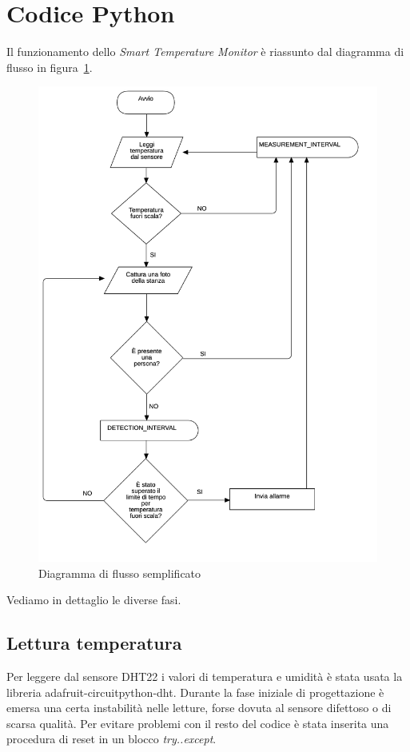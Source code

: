 \documentclass[italian,12pt,a4paper,oneside,final]{report}
\begin{document}
\section{Codice Python}
Il funzionamento dello \emph{Smart Temperature Monitor} è riassunto dal diagramma di flusso in figura~\ref{fig:flowchart}.
\begin{figure}[h]
	\centering
	\includegraphics[scale=0.215]{flowchart.png}
	\caption{Diagramma di flusso semplificato}
	\label{fig:flowchart}
\end{figure}
Vediamo in dettaglio le diverse fasi.

\subsection{Lettura temperatura}
Per leggere dal sensore DHT22 i valori di temperatura e umidità è stata usata la libreria adafruit-circuitpython-dht.
Durante la fase iniziale di progettazione è emersa una certa instabilità nelle letture, forse dovuta al sensore difettoso o di scarsa qualità.
Per evitare problemi con il resto del codice è stata inserita una procedura di reset in un blocco \textit{try..except}.
\end{document}

